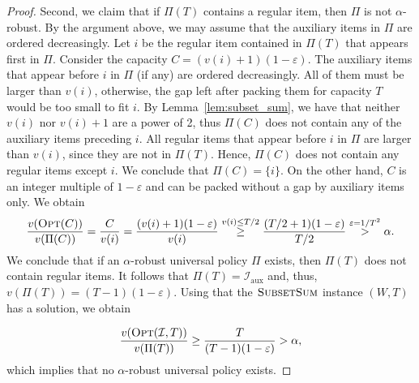 \documentclass[11pt]{article}
\newcommand{\opt}{\textsc{Opt}}
\newcommand{\OPT}{\opt}
\newcommand{\I}{\mathcal{I}}
\renewcommand{\epsilon}{\varepsilon}
\begin{document}
\begin{proof}
Second, we claim that if $\Pi(T)$ contains a regular item, then $\Pi$
is not $\alpha$-robust. By the argument above, we may assume that
the auxiliary items in $\Pi$ are ordered decreasingly. Let $i$ be
the regular item contained in $\Pi(T)$ that appears first in $\Pi$.
Consider the capacity $C=(v(i)+1)(1-\epsilon).$ The auxiliary items
that appear before $i$ in $\Pi$ (if any) are ordered decreasingly.
All of them must be larger than $v(i)$, otherwise, the gap left after
packing them for capacity $T$ would be too small to fit $i$. By
Lemma~\ref{lem:subset_sum}, we have that neither $v(i)$ nor $v(i)+1$
are a power of 2, thus $\Pi(C)$ does not contain any of the auxiliary
items preceding $i$. All regular items that appear before $i$ in
$\Pi$ are larger than $v(i)$, since they are not in $\Pi(T)$. Hence,
$\Pi(C)$ does not contain any regular items except $i$. We conclude
that $\Pi(C)=\{i\}$. On the other hand, $C$ is an integer multiple
of $1-\epsilon$ and can be packed without a gap by auxiliary items
only. We obtain
\[
\frac{v(\OPT(C))}{v(\Pi(C))}=\frac{C}{v(i)}=\frac{(v(i)+1)(1-\varepsilon)}{v(i)}\overset{v(i)\leq
T/2}{\geq}\frac{(T/2+1)(1-\varepsilon)}{T/2}\overset{\varepsilon=1/T^{2}}{>}\alpha.
\]
We conclude that if an $\alpha$-robust universal policy $\Pi$ exists,
then $\Pi(T)$ does not contain regular items. It follows that $\Pi(T)=\I_{\text{{aux}}}$
and, thus, $v(\Pi(T))=(T-1)(1-\epsilon).$ Using that the $\textsc{SubsetSum}$
instance $(W,T)$ has a solution, we obtain

\[
\frac{v(\OPT(\I,T))}{v(\Pi(T))}\geq\frac{T}{(T-1)(1-\epsilon)}>\alpha,
\]
which implies that no $\alpha$-robust universal policy exists.
\end{proof}


\end{document}
